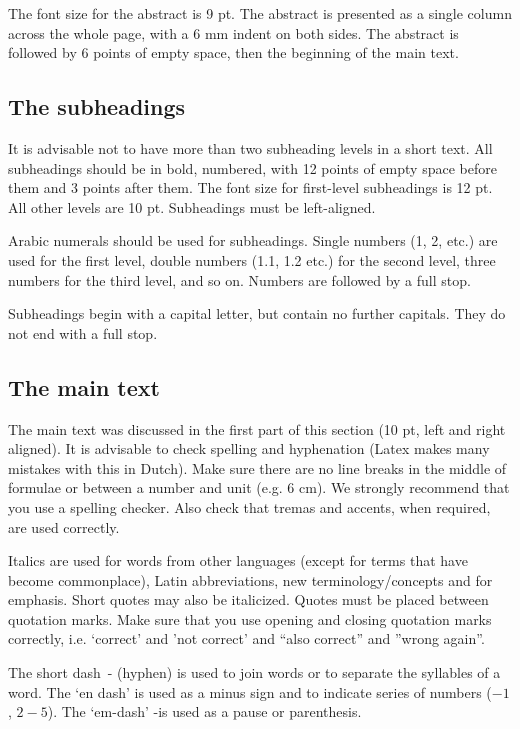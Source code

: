 The font size for the abstract is 9 pt. The abstract is presented as a single column across the whole page, with a 6 mm indent on both sides. The abstract is followed by 6 points of empty space, then the beginning of the main text.

\subsection{The subheadings}\label{sec:_the_subeadings}
It is advisable not to have more than two subheading levels in a short text. All subheadings should be in bold, numbered, with 12 points of empty space before them and 3 points after them. The font size for first-level subheadings is 12 pt. All other levels are 10 pt. Subheadings must be left-aligned.

Arabic numerals should be used for subheadings. Single numbers (1, 2, etc.) are used for the first level, double numbers (1.1, 1.2 etc.) for the second level, three numbers for the third level, and so on. Numbers are followed by a full stop.

Subheadings begin with a capital letter, but contain no further capitals. They do not end with a full stop.

\subsection{The main text}\label{sec:_the_main_text}
The main text was discussed in the first part of this section (10 pt, left and right aligned). It is advisable to check spelling and hyphenation (Latex makes many mistakes with this in Dutch). Make sure there are no line breaks in the middle of formulae or between a number and unit (e.g. 6 cm). We strongly recommend that you use a spelling checker. Also check that tremas and accents, when required, are used correctly.

Italics are used for words from other languages (except for terms that have become commonplace), Latin abbreviations, new terminology/concepts and for emphasis. Short quotes may also be italicized. Quotes must be placed between quotation marks. Make sure that you use opening and closing quotation marks correctly, i.e. `correct' and 'not correct' and ``also correct'' and ''wrong again''.

The short dash - (hyphen) is used to join words or to separate the syllables of a word. The `en dash' is used as a minus sign and to indicate series of numbers ($-1$, $2 - 5$). The `em-dash' -is used as a pause or parenthesis.

